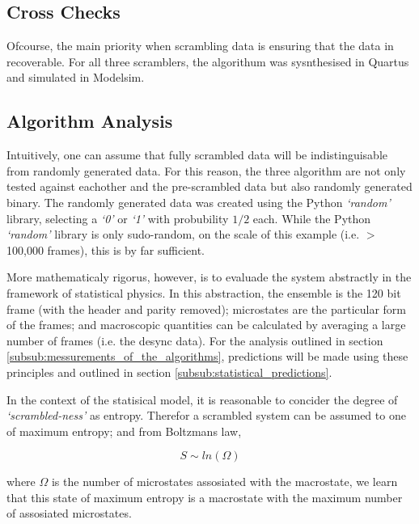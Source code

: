 	\subsection{Cross Checks} %
	\label{sub:cross_checks}
	
		Ofcourse, the main priority when scrambling data is ensuring that the data in recoverable.
		For all three scramblers, the algorithum was sysnthesised in Quartus\supercite{ref:quartus} and simulated in Modelsim\supercite{ref:modelsim}.


	\subsection{Algorithm Analysis}
	\label{sub:algorithm_analysis}

		Intuitively, one can assume that fully scrambled data will be indistinguisable from randomly generated data. 
		For this reason, the three algorithm are not only tested against eachother and the pre-scrambled data but also randomly generated binary.
		The randomly generated data was created using the Python \textit{`random'} library, selecting a \textit{`0'} or \textit{`1'} with probubility $1/2$ each.
		While the Python \textit{`random'} library is only sudo-random, on the scale of this example (i.e. $>$ 100,000 frames), this is by far sufficient.
		\par
		More mathematicaly rigorus, however, is to evaluade the system abstractly in the framework of statistical physics.
		In this abstraction, the ensemble is the 120 bit frame (with the header and parity removed); 
		microstates are the particular form of the frames;
		and macroscopic quantities can be calculated by averaging a large number of frames (i.e. the desync data).
		For the analysis outlined in section \ref{subsub:messurements_of_the_algorithms}, predictions will be made using these principles and outlined in section \ref{subsub:statistical_predictions}.
		\par
		In the context of the statisical model, it is reasonable to concider the degree of \textit{`scrambled-ness'} as entropy.
		Therefor a scrambled system can be assumed to one of maximum entropy; and from Boltzmans law,

		\begin{equation}
			S \sim ln(\Omega)
			\label{eqn:boltzman}
		\end{equation}

		where $\Omega$ is the number of microstates assosiated with the macrostate, we learn that this state of maximum entropy is a macrostate with the maximum number of assosiated microstates.

